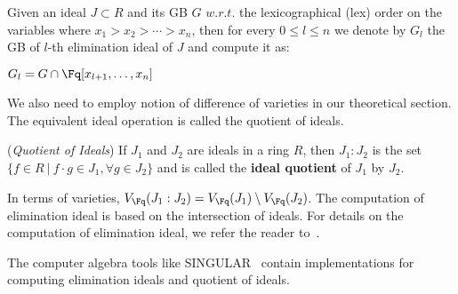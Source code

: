 \begin{Theorem}
\label{def:elim}
Given an ideal $J \subset R$ and its GB $G$ $w.r.t.$ the
lexicographical (lex) order on the variables 
where $x_1 > x_2 > \cdots > x_n$, then for every $0 \leq l \leq n$ we
denote by $G_l$ the GB of $l$-th elimination ideal of $J$ and compute it as:
\begin{center}
$G_l = G \cap \Fq[x_{l+1},\dots,x_n]$
\end{center}
\end{Theorem}

We also need to employ notion of difference of varieties in our theoretical
section. The equivalent ideal operation is called the quotient of ideals.

\begin{Definition}
\label{def:quo}
({\it Quotient of Ideals}) If $J_1$ and $J_2$ are ideals in a ring $R$,
then $J_1:J_2$ is the set 
  $\{f \in R \ |\ f\cdot g \in J_1, \forall g \in J_2\}$ %
and is called the {\bf ideal quotient} of $J_1$ by $J_2$.
\end{Definition}

In terms of varieties, $V_{\Fq}(J_1:J_2) = V_{\Fq}(J_1) \setminus V_{\Fq}(J_2)$.
The computation of elimination ideal is based on the intersection of ideals. 
For details on the computation of elimination ideal, we refer the reader to~\cite{ideals:book}. 

\par The computer algebra tools like SINGULAR~\cite{DGPS_410} contain implementations for 
computing elimination ideals and quotient of ideals.  
  